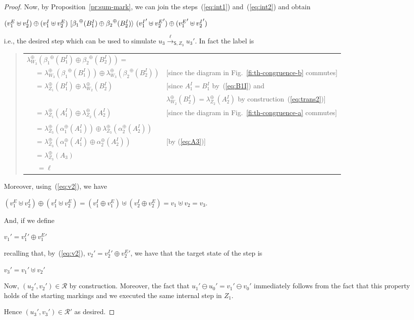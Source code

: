 \documentclass{LMCS}
\newcommand{\mjoin}{\ensuremath{\uplus}}
\newcommand{\mon}[1]{\ensuremath{{#1}^\oplus}}
\newcommand{\monSub}[2]{\ensuremath{{#1}_{#2}^\oplus}}
\newcommand{\trans}[1]{\ensuremath{\ [\/{#1}\/\rangle}\ }
\newcommand{\ltr}[3][x]{\ensuremath{\stackrel{{#3}}{\longrightarrow}_{\mathsf{#1},#2}}}
\begin{document}
\begin{proof}
  \bigskip
\noindent
  Now, by Proposition~\ref{pr:sum-mark}, we can join the
  steps~(\ref{eq:int1}) and~(\ref{eq:int2}) and obtain
  \begin{center}
    $(v_1^E \mjoin v_2^I) \oplus (v_1^I \mjoin v_2^E) 
    \trans{\mon{\beta_1}(B_1^I) \oplus \mon{\beta_2}(B_2^I)} 
    ({v_1^I}' \mjoin {v_2^E}') \oplus ({v_1^E}' \mjoin {v_2^I}')$
  \end{center}
  i.e., the desired step which can be used to simulate $u_3
  \ltr[S]{Z_3}{\ell} u_3'$. In fact the label is
  \begin{quote}
    \begin{tabular}{ll}
      $\monSub{\lambda}{{W_3}}(\mon{\beta_1}(B_1^I) \oplus \mon{\beta_2}(B_2^I)) =$\\
\ \ \ = $\monSub{\lambda}{{W_3}}(\mon{\beta_1}(B_1^I)) \oplus \monSub{\lambda}{{W_3}}(\mon{\beta_2}(B_2^I))$ & [since the diagram in Fig.~\ref{fi:th-congruence-b} commutes]\\
\ \ \ = $\monSub{\lambda}{{Z_1}}(B_1^I) \oplus \monSub{\lambda}{{W_2}}(B_2^I)$ &  
      [since $A_1^I = B_1^I$ by~(\ref{eq:B1I})  and\\
      & \phantom{[}$\monSub{\lambda}{{W_2}}(B_2^I) = \monSub{\lambda}{{Z_2}}(A_2^I)$ by construction~(\ref{eq:trans2})]\\
\ \ \ = $\monSub{\lambda}{{Z_1}}(A_1^I) \oplus \monSub{\lambda}{{Z_2}}(A_2^I)$ &  
       [since the diagram in Fig.~\ref{fi:th-congruence-a} commutes]\\\\
\ \ \ = $\monSub{\lambda}{{Z_3}}(\monSub{\alpha}{1}(A_1^I)) \oplus \monSub{\lambda}{{Z_3}}(\monSub{\alpha}{2}(A_2^I))$\\
\ \ \ = $\monSub{\lambda}{{Z_3}}(\monSub{\alpha}{1}(A_1^I) \oplus \monSub{\alpha}{2}(A_2^I))$ &  [by (\ref{eq:A3})]\\
\ \ \ = $\monSub{\lambda}{{Z_3}}(A_3)$\\
\ \ \ $= \ell$
    \end{tabular}
  \end{quote}
  
\noindent
  Moreover, using~(\ref{eq:v2}), we have 
  \begin{center}
    $(v_1^E \mjoin v_2^I) \oplus (v_1^I \mjoin v_2^E) = (v_1^I \oplus
    v_1^E) \mjoin (v_2^I \oplus v_2^E) = v_1 \mjoin v_2 =
    v_3$.
  \end{center}
  And, if we define
  \begin{center}
    $v_1' = {v_1^I}' \oplus {v_1^E}'$ 
  \end{center}
  recalling that, by~(\ref{eq:v2}), $v_2' = {v_2^I}' \oplus {v_2^E}'$,
  we have that the target state of the step is
  \begin{center}
    $v_3' = v_1' \mjoin v_2'$
  \end{center}
  
  Now, $(u_2', v_2') \in \mathcal{R}$ by construction. Moreover, the
  fact that $u_1' \ominus u_0' = v_1' \ominus v_0'$ immediately follows from
  the fact that this property holds of the starting markings and we executed
  the same internal step in $Z_1$.

  Hence $(u_3',v_3') \in \mathcal{R}'$ as desired.
\end{proof}
\end{document}
